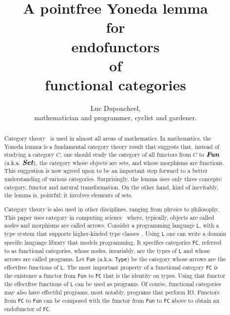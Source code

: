 \documentclass[11pt]{article}
\newcommand{\Fun}{\mbox{\bf {\em Fun}}}
\newcommand{\Set}{\mbox{\bf {\em Set}}}
\begin{document}
\title{
A pointfree Yoneda lemma\\
for\\
endofunctors\\
of\\
functional categories
}

\author{
Luc Duponcheel, \\ 
mathematician and programmer, cyclist and gardener.
}

\maketitle

\begin{abstract}
Category theory~\cite{book:MacLaneSaunders} is used in almost all areas of mathematics.  In mathematics, the Yoneda
lemma is a fundamental category theory result that suggests that, instead of studying a category $C$, one should study
the category of all functors from $C$ to $\Fun$ (a.k.a. $\Set$), the category whose objects are sets, and whose
morphisms are functions. This suggestion is now agreed upon to be an important step forward to a better understanding of
various categories. Surprisingly, the lemma uses only three concepts: category, functor and natural transformation. On
the other hand, kind of inevitably, the lemma is, pointful: it involves elements of sets.

\vspace{6pt}

Category theory is also used in other disciplines, ranging from physics to philosophy. This paper uses category in
computing science~\cite{book:BarrWells} where, typically, objects are called nodes and morphisms are called arrows.
Consider a programming language {\tt L}, with a type system that supports higher-kinded type classes~\cite{book:Pierce}.
Using {\tt L} one can write a domain specific language library that models programming. It specifies categories
{\tt FC}, referred to as functional categories, whose nodes, invariably, are the types of {\tt L} and whose arrows are
called programs. Let {\tt Fun} (a.k.a. {\tt Type}) be the category whose arrows are the effectfree functions of {\tt L}.
The most important property of a functional category {\tt FC} is the existence a functor from {\tt Fun} to {\tt FC} that
is the identity on types. Using that functor the effectfree functions of {\tt L} can be used as programs. Of course,
functional categories may also have effectful programs, most notably, programs that perform IO. Functors from {\tt FC}
to {\tt Fun} can be composed with the functor from {\tt Fun} to {\tt FC} above to obtain an endofunctor of {\tt FC}.


\end{abstract}
\end{document}
